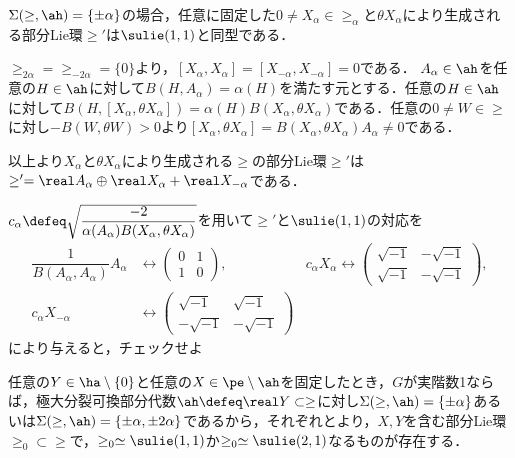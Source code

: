 \begin{lem}\label{lem:su11}
  
  $\Sigma(\ge,\ah) = \{\pm\alpha\}$の場合，任意に固定した$0\neq X_{\alpha}\in \ge_{\alpha}$と$\theta X_{\alpha}$により生成される部分Lie環$\ge'$は$\sulie(1,1)$と同型である．
\end{lem}

\begin{npfwn}
  $\ge_{2\alpha} = \ge_{-2\alpha} = \{0\}  $より，$[X_{\alpha}, X_{\alpha}] = [X_{-\alpha}, X_{-\alpha}] = 0 $である． $A_{\alpha}\in \ah $を任意の$H\in \ah$に対して$B(H,A_{\alpha}) = \alpha(H) $を満たす元とする．任意の$H\in \ah$に対して$B(H, [X_{\alpha}, \theta X_{\alpha}]) = \alpha(H) B(X_{\alpha}, \theta X_{\alpha}) $である．任意の$0\neq W\in \ge$に対し$-B(W,\theta W) > 0 $より$[X_{\alpha}, \theta X_{\alpha}] = B(X_{\alpha}, \theta X_{\alpha})A_{\alpha}\neq 0 $である．

  以上より$X_{\alpha} $と$\theta X_{\alpha} $により生成される$\ge$の部分Lie環$\ge'$は$\ge' = \real A_{\alpha}\oplus \real X_{\alpha} + \real X_{-\alpha}  $である．

  $c_{\alpha}\defeq \sqrt{\dfrac{-2}{\alpha(A_{\alpha})B(X_{\alpha}, \theta X_{\alpha})}} $を用いて$\ge'$と$\sulie(1,1)$の対応を
  \begin{align*}
    \dfrac{1}{B(A_{\alpha}, A_{\alpha})} A_{\alpha} &\leftrightarrow
    \begin{pmatrix}
      0 & 1 \\ 1 & 0
    \end{pmatrix},& c_{\alpha} X_{\alpha} \leftrightarrow
      \begin{pmatrix}
        \sqrt{-1} & -\sqrt{-1} \\ \sqrt{-1} & -\sqrt{-1}
      \end{pmatrix},\\
    c_{\alpha} X_{-\alpha} &\leftrightarrow
      \begin{pmatrix}
        \sqrt{-1} & \sqrt{-1} \\ -\sqrt{-1} & -\sqrt{-1}
      \end{pmatrix} 
  \end{align*}
  により与えると，チェックせよ
\end{npfwn}

\begin{cor}\label{cor:sub-lie-alg}
  任意の$Y\in \ha\setminus\{0\} $と任意の$X\in \pe\setminus \ah$を固定したとき，$G$が実階数1ならば，極大分裂可換部分代数$\ah\defeq \real Y\subset \ge$に対し$\Sigma(\ge,\ah) = \{\pm\alpha\} $あるいは$\Sigma(\ge,\ah)  = \{\pm\alpha, \pm 2\alpha \} $であるから，それぞれとより，$X,Y$を含む部分Lie環$\ge_0\subset \ge$で，$\ge_0\simeq \sulie(1,1) $か$\ge_0\simeq \sulie(2,1)$なるものが存在する．
\end{cor}


